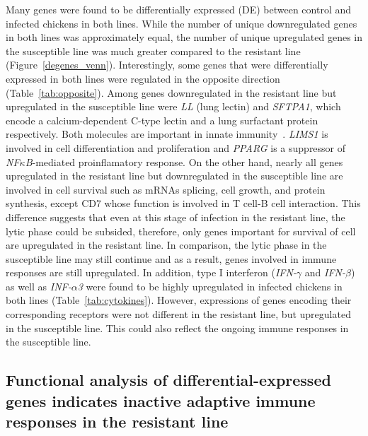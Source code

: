 \documentclass[10pt]{article}
\begin{document}
Many genes were found to be differentially expressed (DE) between
control and infected chickens in both lines.  While the number of
unique downregulated genes in both lines was approximately equal,
the number of unique upregulated genes in the susceptible line
was much greater compared to the resistant line
(Figure~\ref{degenes_venn}).  Interestingly, some genes that were
differentially expressed in both lines were regulated in the
opposite direction (Table~\ref{tab:opposite}).  Among genes
downregulated in the resistant line but upregulated in the
susceptible line were {\em LL} (lung lectin) and {\em SFTPA1},
which encode a calcium-dependent C-type lectin and a lung
surfactant protein respectively.  Both molecules are important in
innate immunity~\cite{hogenkamp2008chicken,kingma2006defense}.
{\em LIMS1} is involved in cell differentiation and proliferation
and {\em PPARG} is a suppressor of {\em NF$\kappa$B}-mediated
proinflamatory response.  On the other hand, nearly all genes
upregulated in the resistant line but downregulated in the
susceptible line are involved in cell survival such as mRNAs
splicing, cell growth, and protein synthesis, except CD7 whose
function is involved in T cell-B cell interaction.  This
difference suggests that even at this stage of infection in the
resistant line, the lytic phase could be subsided, therefore,
only genes important for survival of cell are upregulated in the
resistant line.  In comparison, the lytic phase in the
susceptible line may still continue and as a result, genes
involved in immune responses are still upregulated.  In addition,
type I interferon ({\em IFN-$\gamma$} and {\em IFN-$\beta$}) as
well as {\em INF-$\alpha$3} were found to be highly upregulated
in infected chickens in both lines  (Table~\ref{tab:cytokines}).
However, expressions of genes encoding their corresponding
receptors were not different in the resistant line, but
upregulated in the susceptible line.  This could also reflect the
ongoing immune responses in the susceptible line.

\subsection*{Functional analysis of differential-expressed genes
indicates inactive adaptive immune responses in the resistant
line}
\end{document}
